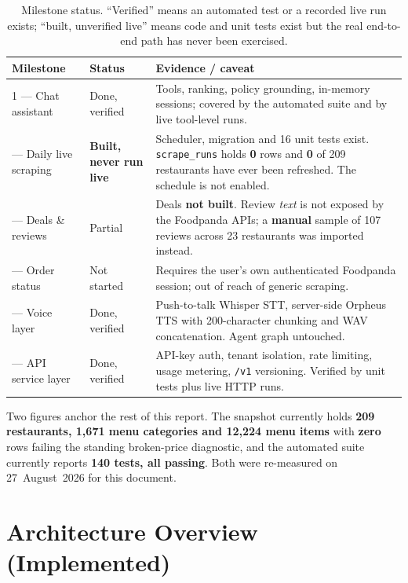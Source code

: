 \documentclass[11pt,a4paper]{article}
\newcommand{\code}[1]{\texttt{\small #1}}
\begin{document}
\begin{table}[htbp]
\centering
\caption{Milestone status. ``Verified'' means an automated test or a recorded
live run exists; ``built, unverified live'' means code and unit tests exist but
the real end-to-end path has never been exercised.}
\label{tab:milestones}
\small
\begin{tabularx}{\textwidth}{@{}l l X@{}}
\toprule
\textbf{Milestone} & \textbf{Status} & \textbf{Evidence / caveat} \\
\midrule
1 --- Chat assistant & Done, verified &
Tools, ranking, policy grounding, in-memory sessions; covered by the automated
suite and by live tool-level runs. \\
\addlinespace
2 --- Daily live scraping & \textbf{Built, never run live} &
Scheduler, migration and 16 unit tests exist. \code{scrape\_runs} holds
\textbf{0} rows and \textbf{0} of 209 restaurants have ever been refreshed. The
schedule is not enabled. \\
\addlinespace
3 --- Deals \& reviews & Partial & Deals \textbf{not built}. Review
\emph{text} is not exposed by the Foodpanda APIs; a \textbf{manual} sample of
107 reviews across 23 restaurants was imported instead. \\
\addlinespace
4 --- Order status & Not started &
Requires the user's own authenticated Foodpanda session; out of reach of
generic scraping. \\
\addlinespace
5 --- Voice layer & Done, verified &
Push-to-talk Whisper STT, server-side Orpheus TTS with 200-character chunking
and WAV concatenation. Agent graph untouched. \\
\addlinespace
6 --- API service layer & Done, verified &
API-key auth, tenant isolation, rate limiting, usage metering, \code{/v1}
versioning. Verified by unit tests plus live HTTP runs. \\
\bottomrule
\end{tabularx}
\end{table}

\noindent
Two figures anchor the rest of this report. The snapshot currently holds
\textbf{209 restaurants, 1{,}671 menu categories and 12{,}224 menu items} with
\textbf{zero} rows failing the standing broken-price diagnostic, and the
automated suite currently reports \textbf{140 tests, all passing}. Both were
re-measured on 27~August~2026 for this document.

\section{Architecture Overview (Implemented)}
\end{document}
